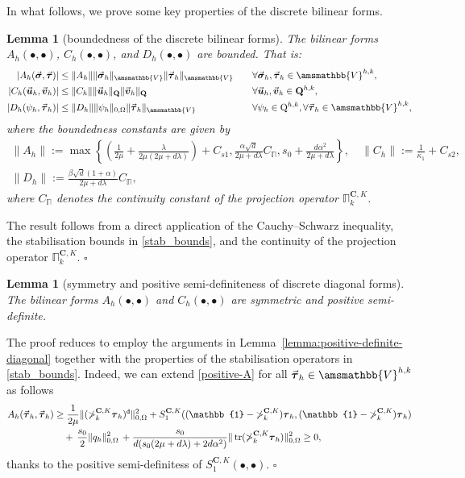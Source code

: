\documentclass[fleqn,a4paper]{cas-sc}
\newcommand\tr{\mathop{\mathrm{tr}}\nolimits}
\newcommand{\bC}{\mathbf{C}}
\newcommand{\Om}{\Omega}
\newcommand{\bu}{\boldsymbol{u}}
\newcommand{\bv}{\boldsymbol{v}}
\newcommand{\0}{\boldsymbol{0}}
\newcommand\bQ{\mathbf{Q}}
\newcommand\rQ{\mathrm{Q}}
\newcommand\bbV{\amsmathbb{V}}
\newcommand\bbPi{\mathbb{\Pi}}
\newcommand\bbOne{\mathbb{1}}
\newcommand\bsigma{\boldsymbol{\sigma}}
\newcommand\btau{\boldsymbol{\tau}}
\numberwithin{equation}{section}
\numberwithin{figure}{section}
\newtheorem{lemma}[theorem]{Lemma}
\newenvironment{proof}{\noindent{\it Proof.}}{\hfill$\square$}
\begin{document}
In what follows, we prove some key properties of the discrete bilinear forms.
{\begin{lemma}[boundedness of the discrete bilinear forms]\label{lem:boundedness_bilinear_h}
The bilinear forms $A_h(\bullet,\bullet)$, $C_h(\bullet,\bullet)$, and $D_h(\bullet,\bullet)$ are bounded. That is:
\begin{align*}
|A_h(\vec{\bsigma}, \vec{\btau})| &\leq \|A_h\| \|\vec{\bsigma}_h\|_{\bbV} \|\vec{\btau}_h\|_{\bbV} \quad &&\forall \vec{\bsigma}_h, \vec{\btau}_h \in \bbV^{h,k}, \\
|C_h(\vec{\bu}_h, \vec{\bv}_h)| &\leq \|C_h\| \|\vec{\bu}_h\|_{\bQ} \|\vec{\bv}_h\|_{\bQ} \quad &&\forall \vec{\bu}_h, \vec{\bv}_h \in \bQ^{h,k}, \\
|D_h(\psi_h, \vec{\btau}_h)| &\leq \|D_h\| \|\psi_h\|_{0,\Omega} \|\vec{\btau}_h\|_{\bbV} \quad &&\forall \psi_h \in \rQ^{h,k}, \forall \vec{\btau}_h \in \bbV^{h,k},
\end{align*}
where the boundedness constants are given by
\begin{gather*}
\|A_h\| := \max\left\{ \left(\frac{1}{2\mu} + \frac{\lambda}{2\mu(2\mu+d\lambda)}\right)+C_{s1}, \frac{\alpha\sqrt{d}}{2\mu+d\lambda}C_\bbPi, s_0+\frac{d\alpha^2}{2\mu+d\lambda} \right\}, \quad \|C_h\| := \frac{1}{\kappa_1}+C_{s2}, \quad \\
\|D_h\| := \frac{\beta\sqrt{d}(1+\alpha)}{2\mu+d\lambda}C_\bbPi,
\end{gather*}
where $C_\bbPi$ denotes the continuity constant of the projection operator $\bbPi_{k}^{\bC,K}$.
\end{lemma}
\begin{proof}
The result follows from a direct application of the Cauchy--Schwarz inequality, the stabilisation bounds in \eqref{stab_bounds}, and the continuity of the projection operator $\bbPi_{k}^{\bC,K}$.
\end{proof}}
{\begin{lemma}[symmetry and positive semi-definiteness of discrete diagonal forms]\label{lemma:positive-definite-diagonal-discrete}
    The bilinear forms $A_h(\bullet,\bullet)$ and  $C_h(\bullet,\bullet)$ are symmetric and positive semi-definite.
\end{lemma}
\begin{proof}
    The proof reduces to employ the arguments in Lemma~\ref{lemma:positive-definite-diagonal} together with the properties of the stabilisation operators in \eqref{stab_bounds}. Indeed, we can extend \eqref{positive-A} for all $\vec{\btau}_h\in \bbV^{h,k}$ as follows
    \begin{align}
        A_h(\vec{\btau}_h, \vec{\btau}_h) &\geq \frac{1}{2\mu}\|(\bbPi_{k}^{\bC,K}\btau_h)^{\tt d}\|^{2}_{0,\Om}+ S_1^{\bC,K}((\bbOne-\bbPi_{k}^{\bC,K})\btau_h,(\bbOne-\bbPi_{k}^{\bC,K})\btau_h) \nonumber\\
        & \quad + \, \frac{s_{0}}{2}\|q_h\|^{2}_{0,\Om}\, +
        \frac{s_0}{d(s_0(2\mu + d\lambda) + 2d\alpha^2)}\|\tr (\bbPi_{k}^{\bC,K}\btau_h)\|^{2}_{0,\Om} \geq 0, \label{positive-definite-A_h}
    \end{align}
    thanks to the positive semi-definitess of $S_1^{\bC,K}(\bullet,\bullet)$.
\end{proof}
}
\end{document}
